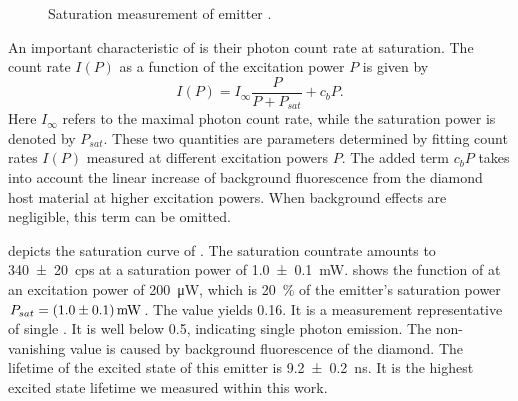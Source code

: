		
		\begin{figure}[!htb]
			\centering
			\caption[Saturation measurement of an emitter]{Saturation measurement of emitter \embroad.}
			\label{fig::sat_Ir8}
		\end{figure}

		An important characteristic of \spss is their photon count rate at saturation. The count rate $I(P)$ as a function of the excitation power $P$ is given by
		\begin{equation}
			I(P) = I_{\infty} \frac{P}{P + P_{sat}} + c_b P.
		\end{equation}
		Here $I_{\infty}$ refers to the maximal photon count rate, while the saturation power is denoted by $P_{sat}$. These two quantities are parameters determined by fitting count rates $I(P)$ measured at different excitation powers $P$. The added term $c_b P$ takes into account the linear increase of background fluorescence from the diamond host material at higher excitation powers. When background effects are negligible, this term can be omitted.

		 depicts the saturation curve of \embroad.
		The saturation countrate amounts to \SI[separate-uncertainty]{340\pm20}{cps} at a saturation power of \SI[separate-uncertainty]{1.0\pm0.1}{mW}.
		 shows the \gt function of \embroad at an excitation power of \SI{200}{\micro\W}, which is \SI{20}{\percent} of the emitter's saturation power $P_{sat}=\SI[separate-uncertainty]{1.0\pm0.1}{mW}$.
		The \gtz value yields \num{0.16}.
		It is a \gt measurement representative of single \sivs.
		It is well below \num{0.5}, indicating single photon emission.
		The non-vanishing \gtz value is caused by background fluorescence of the diamond.
		The lifetime of the excited state of this emitter is \SI[separate-uncertainty]{9.2\pm0.2}{ns}.
		It is the highest excited state lifetime we measured within this work.
		
